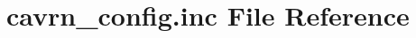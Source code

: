 \hypertarget{cavrn__config_8inc}{}\section{cavrn\+\_\+config.\+inc File Reference}
\label{cavrn__config_8inc}
